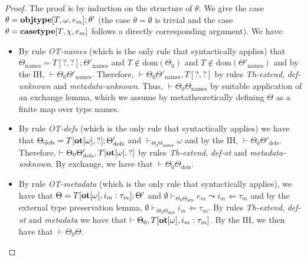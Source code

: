 \begin{proof}
The proof is by induction on the structure of $\theta$. We give the case $\theta = \textbf{objtype}[T, \omega, e_m]; \theta'$ (the case $\theta=\emptyset$ is trivial and the case $\theta=\textbf{casetype}[T, \chi, e_m]$ follows a directly corresponding argument). We have:
\begin{itemize}
\item By rule \textit{OT-names} (which is the only rule that syntactically applies) that $\Theta_{\text{names}}=T[?,?];\Theta'_{\text{names}}$ and $T \notin \text{dom}(\Theta_0)$ and $T \notin \text{dom}(\Theta'_{\text{names}})$ and by the IH, $\vdash \Theta_0 \Theta'_{\text{names}}$. Therefore, $\vdash \Theta_0 \Theta'_{\text{names}}, T[?,?]$ by rules \textit{Th-extend}, \textit{def-unknown} and \textit{metadata-unknown}. Thus, $\vdash \Theta_0 \Theta_{\text{names}}$ by suitable application of an exchange lemma, which we assume by metatheoretically defining $\Theta$  as a finite map over type names.
\item By rule \textit{OT-defs} (which is the only rule that syntactically applies) we have that $\Theta_{\text{defs}}=T[\textbf{ot}[\omega],?];\Theta'_{\text{defs}}$ and $\vdash_{\Theta_0\Theta_{\text{names}}} \omega$ and by the IH, $\vdash \Theta_0 \Theta'_{\text{defs}}$. Therefore, $\vdash \Theta_0 \Theta'_{\text{defs}}, T[\textbf{ot}[\omega], ?]$ by rules \textit{Th-extend}, \textit{def-ot} and \textit{metadata-unknown}. By exchange, we have that $\vdash \Theta_0 \Theta_{\text{defs}}$. 
\item By rule \textit{OT-metadata} (which is the only rule that syntactically applies), we have that $\Theta = T[\textbf{ot}[\omega], i_m : \tau_m]; \Theta'$ and $\emptyset \vdash_{\Theta_0 \Theta_{\text{defs}}} e_m \leadsto i_m \Leftarrow \tau_m$ and by the external type preservation lemma, $\emptyset \vdash_{\Theta_0 \Theta_{\text{defs}}} i_m \Leftarrow \tau_m$. By rules \textit{Th-extend}, \textit{def-ot} and \textit{metadata}  we have that $\vdash \Theta_0, T[\textbf{ot}[\omega], i_m : \tau_m]$. By the IH, we then have that $\vdash \Theta_0 \Theta$.
\end{itemize}

\end{proof}
